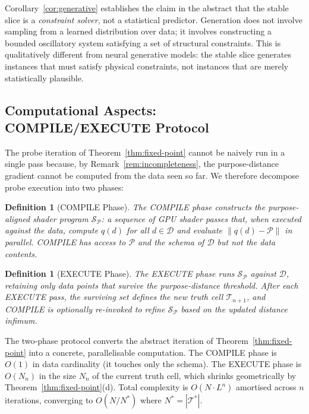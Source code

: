 \documentclass[10pt,twocolumn]{article}
\newtheorem{definition}[theorem]{Definition}
\newcommand{\TruthCell}{\mathcal{T}}
\newcommand{\PurposePoint}{\mathcal{P}}
\newcommand{\DataSpace}{\mathcal{D}}
\begin{document}
Corollary~\ref{cor:generative} establishes the claim in the abstract that
the stable slice is a \emph{constraint solver}, not a statistical predictor.
Generation does not involve sampling from a learned distribution over data;
it involves constructing a bounded oscillatory system satisfying a set
of structural constraints. This is qualitatively different from neural
generative models: the stable slice generates instances that must satisfy
physical constraints, not instances that are merely statistically plausible.

\subsection{Computational Aspects: COMPILE/EXECUTE Protocol}

The probe iteration of Theorem~\ref{thm:fixed-point} cannot be
naively run in a single pass because, by Remark~\ref{rem:incompleteness},
the purpose-distance gradient cannot be computed from the data seen so far.
We therefore decompose probe execution into two phases:

\begin{definition}[COMPILE Phase]
The COMPILE phase constructs the \emph{purpose-aligned shader program}
$\mathcal{S}_\PurposePoint$: a sequence of GPU shader passes that,
when executed against the data, compute $q(d)$ for all $d \in \DataSpace$
and evaluate $\|q(d) - \PurposePoint\|$ in parallel.
COMPILE has access to $\PurposePoint$ and the schema of $\DataSpace$
but not the data contents.
\end{definition}

\begin{definition}[EXECUTE Phase]
The EXECUTE phase runs $\mathcal{S}_\PurposePoint$ against $\DataSpace$,
retaining only data points that survive the purpose-distance threshold.
After each EXECUTE pass, the surviving set defines the new truth cell $\TruthCell_{n+1}$,
and COMPILE is optionally re-invoked to refine $\mathcal{S}_\PurposePoint$
based on the updated distance infimum.
\end{definition}

The two-phase protocol converts the abstract iteration of Theorem~\ref{thm:fixed-point}
into a concrete, parallelisable computation.
The COMPILE phase is $O(1)$ in data cardinality (it touches only the schema).
The EXECUTE phase is $O(N_n)$ in the size $N_n$ of the current truth cell,
which shrinks geometrically by Theorem~\ref{thm:fixed-point}(d).
Total complexity is $O(N \cdot L^n)$ amortised across $n$ iterations,
converging to $O(N/N^*)$ where $N^* = |\TruthCell^*|$.
\end{document}
